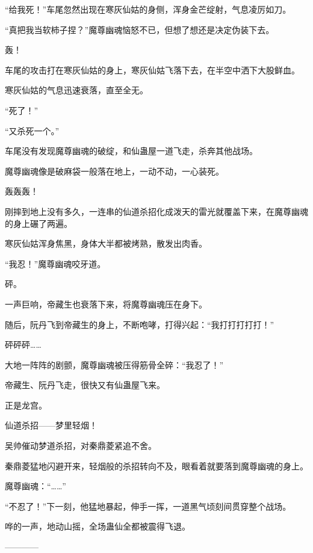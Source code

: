 \begin{this_body}
“给我死！”车尾忽然出现在寒灰仙姑的身侧，浑身金芒绽射，气息凌厉如刀。

“真把我当软柿子捏？”魔尊幽魂恼怒不已，但想了想还是决定伪装下去。

轰！

车尾的攻击打在寒灰仙姑的身上，寒灰仙姑飞落下去，在半空中洒下大股鲜血。

寒灰仙姑的气息迅速衰落，直至全无。

“死了！”

“又杀死一个。”

车尾没有发现魔尊幽魂的破绽，和仙蛊屋一道飞走，杀奔其他战场。

魔尊幽魂像是破麻袋一般落在地上，一动不动，一心装死。

轰轰轰！

刚摔到地上没有多久，一连串的仙道杀招化成泼天的雷光就覆盖下来，在魔尊幽魂的身上碾了两遍。

寒灰仙姑浑身焦黑，身体大半都被烤熟，散发出肉香。

“我忍！”魔尊幽魂咬牙道。

砰。

一声巨响，帝藏生也衰落下来，将魔尊幽魂压在身下。

随后，阮丹飞到帝藏生的身上，不断咆哮，打得兴起：“我打打打打打！”

砰砰砰……

大地一阵阵的剧颤，魔尊幽魂被压得筋骨全碎：“我忍了！”

帝藏生、阮丹飞走，很快又有仙蛊屋飞来。

正是龙宫。

仙道杀招——梦里轻烟！

吴帅催动梦道杀招，对秦鼎菱紧追不舍。

秦鼎菱猛地闪避开来，轻烟般的杀招转向不及，眼看着就要落到魔尊幽魂的身上。

魔尊幽魂：“……”

“不忍了！”下一刻，他猛地暴起，伸手一挥，一道黑气顷刻间贯穿整个战场。

哗的一声，地动山摇，全场蛊仙全都被震得飞退。

------------

\end{this_body}

